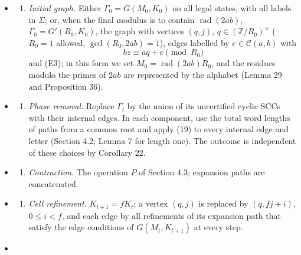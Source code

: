 \documentclass[11pt,reqno]{amsart}
\theoremstyle{definition}
\theoremstyle{remark}
\providecommand{\tightlist}{\setlength{\itemsep}{0pt}\setlength{\parskip}{0pt}}
\begin{document}
\begin{itemize}
\tightlist
\item
  \begin{enumerate}
  \def\labelenumi{(\Roman{enumi})}
  \tightlist
  \item
    \emph{Initial graph.} Either \(\Gamma_0=G(M_0,K_0)\) on all legal
    states, with all labels in \(\Sigma\); or, when the final modulus is to
    contain \(\operatorname{rad}(2ab)\), \(\Gamma_0=G'(R_0,K_0)\), the
    graph with vertices \((q,j)\), \(q\in(\mathbb Z/R_0)^\times\)
    (\(R_0=1\) allowed, \(\gcd(R_0,2ab)=1\)), edges labelled by
    \(e\in\mathcal C(a,b)\) with
    \[
    bz\equiv aq+e\pmod{R_0}
    \]
    and (E3); in
    this form we set \(M_0=\operatorname{rad}(2ab)R_0\), and the residues
    modulo the primes of \(2ab\) are represented by the alphabet
    (Lemma 29 and Proposition 36).
  \end{enumerate}
\item
  \begin{enumerate}
  \def\labelenumi{(\Alph{enumi})}
  \setcounter{enumi}{15}
  \tightlist
  \item
    \emph{Phase removal.} Replace \(\Gamma_t\) by the union of its
    uncertified cyclic SCCs with their internal edges. In each component,
    use the total word lengths of paths from a common root and apply (19)
    to every internal edge and letter (Section 4.2; Lemma 7 for length
    one). The outcome is independent of these choices by Corollary 22.
  \end{enumerate}
\item
  \begin{enumerate}
  \def\labelenumi{(\Alph{enumi})}
  \setcounter{enumi}{2}
  \tightlist
  \item
    \emph{Contraction.} The operation \(P\) of Section 4.3; expansion
    paths are concatenated.
  \end{enumerate}
\item
  \begin{enumerate}
  \def\labelenumi{(\Alph{enumi})}
  \setcounter{enumi}{17}
  \tightlist
  \item
    \emph{Cell refinement.} \(K_{t+1}=fK_t\); a vertex \((q,j)\) is
    replaced by \((q,fj+i)\), \(0\le i<f\), and each edge by all
    refinements of its expansion path that satisfy the edge conditions of
    \(G(M_t,K_{t+1})\) at every step.
  \end{enumerate}
\item
  \begin{enumerate}

\end{enumerate}
\end{itemize}
\end{document}
